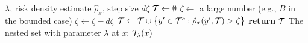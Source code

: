\begin{algorithm}[t]
    \caption{Greedy Sets}
    \label{alg:greedy}
    \begin{algorithmic}[1] %
        \Require $\lambda$, risk density estimate $\hat{\rho}_x$, step size $d\zeta$ 
        \State $\mathcal{T} \gets \emptyset$
        \State $\zeta \gets $ a large number (e.g., $B$ in the bounded case)
        \While{$\zeta > -\lambda$}
            \vspace{1mm}
            \State $\zeta \gets \zeta - d\zeta$
            \vspace{1mm}
            \State $\mathcal{T} \gets \mathcal{T} \cup \big\{ y' \in \mathcal{T}^c : \hat{\rho}_{x}(y',\mathcal{T}) > \zeta \big\}$
        \EndWhile
        \State \textbf{return} $\mathcal{T}$
        \EndProcedure
        \Ensure The nested set with parameter $\lambda$ at $x$: $\mathcal{T}_\lambda(x)$
    \end{algorithmic}
\end{algorithm}

